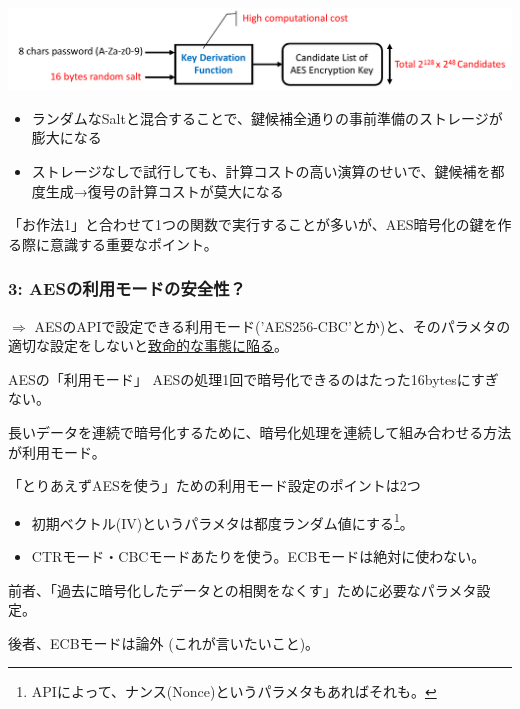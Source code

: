\documentclass[12pt,dvipdfmx]{beamer}
\begin{document}
\begin{frame}

\begin{center}
\includegraphics[width=\linewidth]{Figs/kdf_strong.pdf}
\end{center}

\begin{itemize}
 \item ランダムなSaltと混合することで、\alert{鍵候補全通りの事前準備のストレージが膨大になる}
 \item ストレージなしで試行しても、計算コストの高い演算のせいで、\alert{鍵候補を都度生成→復号の計算コストが莫大になる}
\end{itemize}

\vspace{2ex}

「お作法1」と合わせて1つの関数で実行することが多いが、AES暗号化の鍵を作る際に意識する重要なポイント。

\end{frame}


\begin{frame}
\frametitle{3: AESの利用モードの安全性？}

$\Rightarrow$ AESのAPIで設定できる利用モード('AES256-CBC'とか)と、そのパラメタの適切な設定をしないと\underline{致命的な事態に陥る}。

\vspace{2ex}

\begin{block}{\small AESの「利用モード」}
AESの処理1回で暗号化できるのはたった16bytesにすぎない。

長いデータを連続で暗号化するために、\alert{暗号化処理を連続して組み合わせる方法}が利用モード。
\end{block}

\end{frame}

\begin{frame}
\begin{block}{\small「とりあえずAESを使う」ための利用モード設定のポイントは2つ}
\begin{itemize}
\item 初期ベクトル(IV)というパラメタは\alert{都度ランダム値にする}\footnote[frame]{APIによって、ナンス(Nonce)というパラメタもあればそれも。}。
\item CTRモード・CBCモードあたりを使う。\alert{ECBモードは絶対に使わない。}
\end{itemize} 
\end{block}

前者、「過去に暗号化したデータとの相関をなくす」ために必要なパラメタ設定。

後者、\alert{ECBモードは論外} (これが言いたいこと)。
\end{frame}
\end{document}
